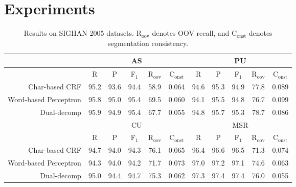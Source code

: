 \section{Experiments}


\begin{table*}[t]
\centering
\begin{small}
\begin{tabular}{ r | c | c | c | c | c | c | c | c | c | c  }
\multicolumn{1}{c|}{} & \multicolumn{5}{c|}{AS} &  \multicolumn{5}{c}{PU} \\
\hline
\multicolumn{1}{c}{}   & \multicolumn{1}{|c}{R} &  \multicolumn{1}{c}{P}     &  \multicolumn{1}{c}{F$_1$}   &    \multicolumn{1}{c}{R$_{\mathrm{oov}}$}   &   \multicolumn{1}{c}{C$_{\mathrm{onst}}$}  & \multicolumn{1}{|c}{R}  &  \multicolumn{1}{c}{P}   &  \multicolumn{1}{c}{F$_1$}   &   \multicolumn{1}{c}{R$_{\mathrm{oov}}$}  &   \multicolumn{1}{c}{C$_{\mathrm{onst}}$} \\ 
Char-based CRF    &  95.2 &   93.6  & 94.4  &  58.9 & 0.064  &  94.6 &	95.3 & 94.9  &   77.8   & 0.089    \\
Word-based Perceptron &  95.8 & 95.0 & 95.4  & 69.5 & 0.060  &  94.1 & 95.5  & 94.8  &  76.7 & 0.099     \\ 
Dual-decomp      & 95.9 & 94.9   & {95.4}  & {67.7} & 0.055 & 94.8 & {95.7} & {95.3}  &  {78.7} & 0.086   \\
\multicolumn{1}{c|}{} &  \multicolumn{5}{c|}{CU} &  \multicolumn{5}{c}{MSR}  \\
\hline
\multicolumn{1}{c}{}   & \multicolumn{1}{|c}{R} &  \multicolumn{1}{c}{P}     &  \multicolumn{1}{c}{F$_1$}   &    \multicolumn{1}{c}{R$_{\mathrm{oov}}$}   &   \multicolumn{1}{c}{C$_{\mathrm{onst}}$}  & \multicolumn{1}{|c}{R}  &  \multicolumn{1}{c}{P}   &  \multicolumn{1}{c}{F$_1$}   &   \multicolumn{1}{c}{R$_{\mathrm{oov}}$}  &   \multicolumn{1}{c}{C$_{\mathrm{onst}}$} \\ 
Char-based CRF    & 94.7 & 94.0 & 94.3  & {76.1}  & 0.065 & 96.4 &   96.6 & 96.5  & 71.3 & 0.074 \\
Word-based Perceptron    & 94.3 & 94.0 & 94.2  & 71.7  & 0.073 &  97.0 &  97.2 & 97.1  & 74.6 & 0.063  \\
Dual-decomp  & {95.0} & 94.4  & {94.7}  & {75.3} & 0.062 &  {97.3} &  {97.4} &  {97.4}  & {76.0} & 0.055  \\
\end{tabular} 
\caption{Results on SIGHAN 2005 datasets. {R$_{\mathrm{oov}}$}  denotes OOV recall, and C$_{\mathrm{onst}}$ denotes segmentation consistency. }\label{tbl:results}
\end{small}
\end{table*}

